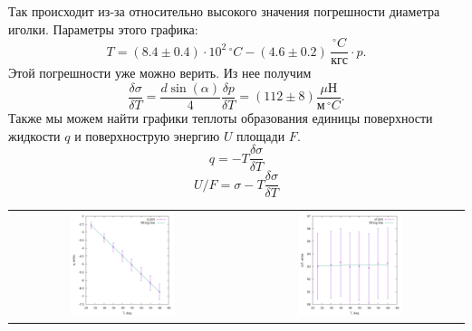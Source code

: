 Так происходит из-за относительно высокого значения погрешности диаметра иголки.
Параметры этого графика:
$$T = (8.4\pm 0.4)\cdot10^2\,^\circ C - (4.6 \pm 0.2)\,\frac{^\circ C}{\text{кгс}}\cdot p.$$
Этой погрешности уже можно верить. Из нее получим
$$\frac{\delta \sigma}{\delta T} = \frac{d\sin(\alpha)}{4}\frac{\delta p}{\delta T} = (112\pm8)\frac{\text{$\mu$Н}}{\text{м}\,^\circ C}.$$
Также мы можем найти графики теплоты образования единицы поверхности жидкости $q$ и поверхнострую энергию $U$ площади $F$.
$$q = - T \frac{\delta \sigma}{\delta T}$$
$$U/F = \sigma - T \frac{\delta \sigma}{\delta T}$$
\begin{center}
\begin{tabular}{cc}
\includegraphics[width=0.48\textwidth]{plot2.png}&
\includegraphics[width=0.48\textwidth]{plot3.png}\\
\end{tabular}
\end{center}

